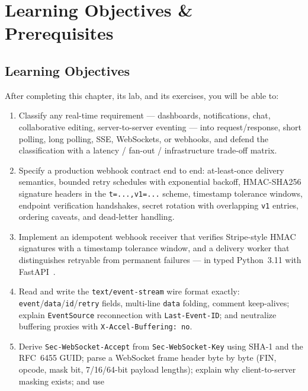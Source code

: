 \section{Learning Objectives \& Prerequisites}
\label{sec:ch11-objectives}

\subsection*{Learning Objectives}
After completing this chapter, its lab, and its exercises, you will be able to:

\begin{enumerate}[label=\textbf{LO-\arabic*.}, leftmargin=2.6cm]
  \item Classify any real-time requirement --- dashboards, notifications,
        chat, collaborative editing, server-to-server eventing --- into
        request/response, short polling, long polling, SSE, WebSockets, or
        webhooks, and defend the classification with a latency / fan-out /
        infrastructure trade-off matrix.
  \item Specify a production webhook contract end to end: at-least-once
        delivery semantics, bounded retry schedules with exponential backoff,
        HMAC-SHA256 signature headers in the \texttt{t=...,v1=...} scheme,
        timestamp tolerance windows, endpoint verification handshakes, secret
        rotation with overlapping \texttt{v1} entries, ordering caveats, and
        dead-letter handling.
  \item Implement an idempotent webhook receiver that verifies Stripe-style
        HMAC signatures with a timestamp tolerance window, and a delivery
        worker that distinguishes retryable from permanent failures --- in
        typed Python~3.11 with FastAPI~\cite{fastapidocs}.
  \item Read and write the \texttt{text/event-stream} wire format exactly:
        \texttt{event}/\texttt{data}/\texttt{id}/\texttt{retry} fields,
        multi-line \texttt{data} folding, comment keep-alives; explain
        \texttt{EventSource} reconnection with \texttt{Last-Event-ID}; and
        neutralize buffering proxies with \texttt{X-Accel-Buffering: no}.
  \item Derive \texttt{Sec-WebSocket-Accept} from
        \texttt{Sec-WebSocket-Key} using SHA-1 and the RFC~6455 GUID; parse a
        WebSocket frame header byte by byte (FIN, opcode, mask bit, 7/16/64-bit
        payload lengths); explain why client-to-server masking exists; and use

\end{enumerate}
